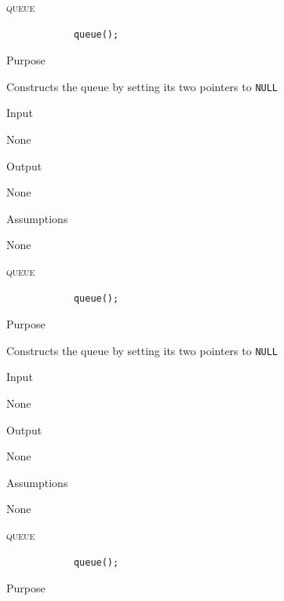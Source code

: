 \documentclass[pdftex, 11pt]{article}
\begin{document}
\begin{description}

	\item{\textsc{queue}}

		\begin{lstlisting}
			queue();
		\end{lstlisting}

		\begin{description}
			\item{Purpose}
				
				Constructs the queue by setting its two pointers
				to \texttt{NULL}

			\item{Input}

				None

			\item{Output}
				
				None

			\item{Assumptions}

				None

		\end{description}


	\item{\textsc{queue}}

		\begin{lstlisting}
			queue();
		\end{lstlisting}

		\begin{description}
			\item{Purpose}
				
				Constructs the queue by setting its two pointers
				to \texttt{NULL}

			\item{Input}

				None

			\item{Output}
				
				None

			\item{Assumptions}

				None

		\end{description}
	\item{\textsc{queue}}

		\begin{lstlisting}
			queue();
		\end{lstlisting}

		\begin{description}
			\item{Purpose}
				

\end{description}
\end{description}
\end{document}
